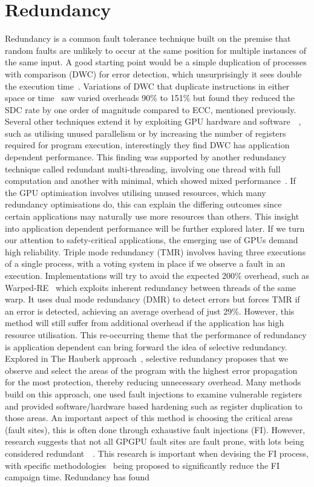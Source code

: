 \documentclass{article}
\begin{document}
\section{Redundancy}
Redundancy is a common fault tolerance technique built on the premise that random faults are unlikely to occur at the same position for multiple instances of the same input. A good starting point would be a simple duplication of processes with comparison (DWC) for error detection, which unsurprisingly it sees double the execution time~\cite{10.1145/1513895.1513907}. Variations of DWC that duplicate instructions in either space or time~\cite{6949170} saw varied overheads 90\% to 151\% but found they reduced the SDC rate by one order of magnitude compared to ECC, mentioned previously. Several other techniques extend it by exploiting GPU hardware and software~\cite{6493606}~\cite{8665772}, such as utilising unused parallelism or by increasing the number of registers required for program execution, interestingly they find DWC has application dependent performance. This finding was supported by another redundancy technique called redundant multi-threading, involving one thread with full computation and another with minimal, which showed mixed performance~\cite{10.1145/2678373.2665686}. If the GPU optimisation involves utilising unused resources, which many redundancy optimisations do, this can explain the differing outcomes since certain applications may naturally use more resources than others. This insight into application dependent performance will be further explored later. If we turn our attention to safety-critical applications, the emerging use of GPUs demand high reliability. Triple mode redundancy (TMR) involves having three executions of a single process, with a voting system in place if we observe a fault in an execution. Implementations will try to avoid the expected 200\% overhead, such as Warped-RE~\cite{7266862} which exploits inherent redundancy between threads of the same warp. It uses dual mode redundancy (DMR) to detect errors but forces TMR if an error is detected, achieving an average overhead of just 29\%. However, this method will still suffer from additional overhead if the application has high resource utilisation. This re-occurring theme that the performance of redundancy is application dependent can bring forward the idea of selective redundancy. Explored in The Hauberk approach~\cite{6012845}, selective redundancy proposes that we observe and select the areas of the program with the highest error propagation for the most protection, thereby reducing unnecessary overhead. Many methods build on this approach, one used fault injections to examine vulnerable registers~\cite{8660708} and provided software/hardware based hardening such as register duplication to those areas. An important aspect of this method is choosing the critical areas (fault sites), this is often done through exhaustive fault injections (FI). However, research suggests that not all GPGPU fault sites are fault prone, with lots being considered redundant~\cite{8574583}~\cite{9035460}. This research is important when devising the FI process, with specific methodologies~\cite{9080079} being proposed to significantly reduce the FI campaign time. Redundancy has found 
\end{document}
